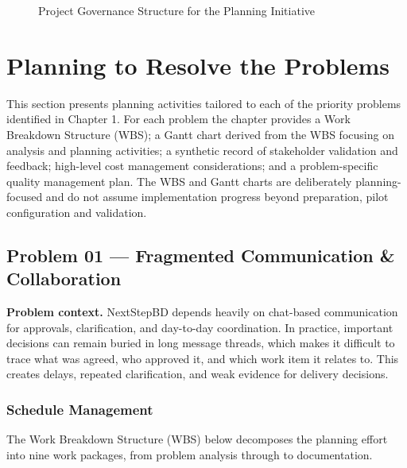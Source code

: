 \documentclass[12pt,a4paper]{report}
\begin{document}
\begin{figure}[H]
{
}
\caption{Project Governance Structure for the Planning Initiative}
\end{figure}

\section{Planning to Resolve the Problems}
This section presents planning activities tailored to each of the priority problems identified in Chapter 1. For each problem the chapter provides a Work Breakdown Structure (WBS); a Gantt chart derived from the WBS focusing on analysis and planning activities; a synthetic record of stakeholder validation and feedback; high-level cost management considerations; and a problem-specific quality management plan. The WBS and Gantt charts are deliberately planning-focused and do not assume implementation progress beyond preparation, pilot configuration and validation.

\subsection{Problem 01 --- Fragmented Communication \& Collaboration}

\textbf{Problem context.} NextStepBD depends heavily on chat-based communication for approvals, clarification, and day-to-day coordination. In practice, important decisions can remain buried in long message threads, which makes it difficult to trace what was agreed, who approved it, and which work item it relates to. This creates delays, repeated clarification, and weak evidence for delivery decisions.

\subsubsection{Schedule Management}
The Work Breakdown Structure (WBS) below decomposes the planning effort into nine work packages, from problem analysis through to documentation.
\end{document}
